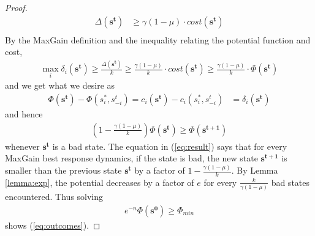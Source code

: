 \begin{thm}
\begin{proof}
\begin{align*}
\Delta(\mathbf{s^t})&\geq \gamma(1-\mu)\cdot cost(\mathbf{s^t})\\
\end{align*}
By the MaxGain definition and the inequality relating the potential function and cost,
\begin{align*}
\max_{i}\delta_i(\mathbf{s^t})\geq \frac{\Delta(\mathbf{s^t})}{k}\geq \frac{\gamma(1-\mu)}{k}\cdot cost(\mathbf{s^t})\geq \frac{\gamma(1-\mu)}{k}\cdot \Phi(\mathbf{s^t})
\end{align*}
and we get what we desire as
\begin{align*}
\Phi(\mathbf{s^t})-\Phi(s_i^\ast,s^t_{-i})
=c_i(\mathbf{s^t})-c_i(s_i^\ast,s^t_{-i})&=\delta_i(\mathbf{s^t})
\end{align*}
and hence
\begin{align}
\left(1-\frac{\gamma(1-\mu)}{k}\right)\Phi(\mathbf{s^t})\geq \Phi(\mathbf{s^{t+1}})\label{eq:result}
\end{align}
whenever $\mathbf{s^t}$ is a bad state. The equation in (\ref{eq:result}) says that for every MaxGain best response dynamics, if the state is bad, the new state $\mathbf{s^{t+1}}$ is smaller than the previous state $\mathbf{s^t}$ by a factor of $1-\frac{\gamma(1-\mu)}{k}$. By Lemma \ref{lemma:exp}, the potential decreases by a factor of $e$ for every $\frac{k}{\gamma(1-\mu)}$ bad states encountered. Thus solving 
\begin{align*}
e^{-n}\Phi(\mathbf{s^0}) \geq \Phi_{min}
\end{align*}
shows (\ref{eq:outcomes}).
\end{proof}
\end{thm}
%